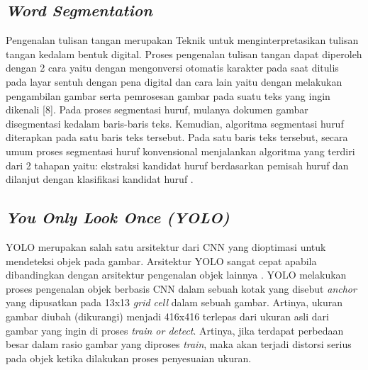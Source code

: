 \subsection{\textit{Word Segmentation}}
Pengenalan tulisan tangan merupakan Teknik untuk menginterpretasikan tulisan tangan kedalam bentuk digital. Proses pengenalan tulisan tangan dapat diperoleh dengan 2 cara yaitu dengan mengonversi otomatis karakter pada saat ditulis pada layar sentuh dengan pena digital dan cara lain yaitu dengan melakukan pengambilan gambar serta pemrosesan gambar pada suatu teks yang ingin dikenali [8]. Pada proses segmentasi huruf, mulanya dokumen gambar disegmentasi kedalam baris-baris teks. Kemudian, algoritma segmentasi huruf diterapkan pada satu baris teks tersebut. Pada satu baris teks tersebut, secara umum proses segmentasi huruf konvensional menjalankan algoritma yang terdiri dari 2 tahapan yaitu: ekstraksi kandidat huruf berdasarkan pemisah huruf dan dilanjut dengan klasifikasi kandidat huruf \citep*{ryu2015word}.

\subsection{\textit{You Only Look Once (YOLO)}}
YOLO merupakan salah satu arsitektur dari CNN yang dioptimasi untuk mendeteksi objek pada gambar. Arsitektur YOLO sangat cepat apabila dibandingkan dengan arsitektur pengenalan objek lainnya . YOLO melakukan proses pengenalan objek berbasis CNN dalam sebuah kotak yang disebut \textit{anchor} yang dipusatkan pada 13x13 \textit{grid cell} dalam sebuah gambar. Artinya, ukuran gambar diubah (dikurangi) menjadi 416x416 terlepas dari ukuran asli dari gambar yang ingin di proses \textit{train or detect}. Artinya, jika terdapat perbedaan besar dalam rasio gambar yang diproses \textit{train}, maka akan terjadi distorsi serius pada objek ketika dilakukan proses penyesuaian ukuran\citep*{jeong2018image}. \\

